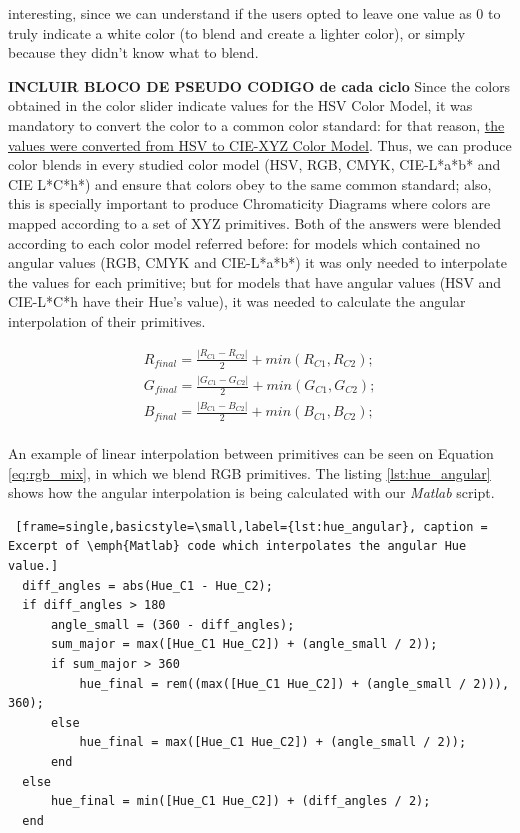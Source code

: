 interesting, since we can understand if the users opted to leave one value as 0 to truly indicate a white color (to blend and create a lighter color), or simply because they
didn't know what to blend. \par
%
\textbf{INCLUIR BLOCO DE PSEUDO CODIGO de cada ciclo}
%
%
Since the colors obtained in the color slider indicate values for the HSV Color Model, it was mandatory to convert the color to a common color standard: for that reason,
\ul{the values were converted from HSV to CIE-XYZ Color Model}. Thus, we can produce color blends in every studied color model (\gls{HSV}, \gls{RGB}, \gls{CMYK}, CIE-L*a*b* and
CIE L*C*h*) and ensure that colors obey to the same common standard; also, this is specially important to produce Chromaticity Diagrams where colors are mapped according to a set
of XYZ primitives. Both of the answers were blended according to each color model referred before: for models which contained no angular values (\gls{RGB}, \gls{CMYK} and
CIE-L*a*b*) it was only needed to interpolate the values for each primitive; but for models that have angular values (\gls{HSV} and CIE-L*C*h have their Hue's value), it was
needed to calculate the angular interpolation of their primitives. \par
%
\begin{equation}
  \label{eq:rgb_mix}
  \begin{aligned}
    R_{final} = \frac{|R_{C1} - R_{C2}|}{2} + min(R_{C1}, R_{C2}); \\
    G_{final} = \frac{|G_{C1} - G_{C2}|}{2} + min(G_{C1}, G_{C2}); \\
    B_{final} = \frac{|B_{C1} - B_{C2}|}{2} + min(B_{C1}, B_{C2}); \\
  \end{aligned}
\end{equation} \par
%
An example of linear interpolation between primitives can be seen on Equation \ref{eq:rgb_mix}, in which we blend \gls{RGB} primitives. The listing \ref{lst:hue_angular} shows
how the angular interpolation is being calculated with our \emph{Matlab} script. \par
%
\begin{lstlisting} [frame=single,basicstyle=\small,label={lst:hue_angular}, caption = Excerpt of \emph{Matlab} code which interpolates the angular Hue value.]
  diff_angles = abs(Hue_C1 - Hue_C2);
  if diff_angles > 180
      angle_small = (360 - diff_angles);
      sum_major = max([Hue_C1 Hue_C2]) + (angle_small / 2));
      if sum_major > 360
          hue_final = rem((max([Hue_C1 Hue_C2]) + (angle_small / 2))), 360);
      else
          hue_final = max([Hue_C1 Hue_C2]) + (angle_small / 2));
      end
  else
      hue_final = min([Hue_C1 Hue_C2]) + (diff_angles / 2);
  end
\end{lstlisting} \par
